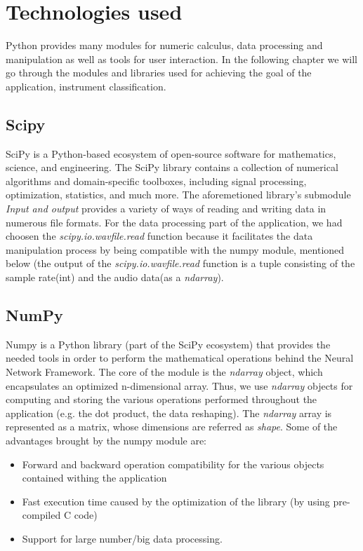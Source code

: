 \chapter{Technologies used}
Python provides many modules for numeric calculus, data processing and manipulation as  well as tools for user interaction.
In the following chapter we will go through the modules and libraries used for achieving the goal
of the application, instrument classification.

\section{Scipy}
SciPy is a Python-based ecosystem of open-source software for mathematics, science, and engineering. The SciPy library contains a collection of numerical algorithms and domain-specific toolboxes, including signal processing, optimization, statistics, and much more.\cite{scpd}
The aforemetioned library's submodule \textit{Input and output} provides a variety of ways of reading and writing data in numerous file formats. For the data processing part of the application, we had choosen the \textit{scipy.io.wavfile.read} function because it facilitates the data manipulation process by being compatible with the numpy module, mentioned below (the output of the \textit{scipy.io.wavfile.read} function is a tuple consisting of the sample rate(int) and the audio data(as a \textit{ndarray}).
\section{NumPy}
Numpy is a Python library (part of the SciPy ecosystem) that provides the needed tools in order to perform the mathematical operations behind
the Neural Network Framework. The core of the module is the \textit{ndarray} object, which encapsulates an
optimized n-dimensional array. Thus, we use \textit{ndarray} objects for computing and storing the various
operations performed throughout the application (e.g. the dot product, the data reshaping). The \textit{ndarray}
array is represented as a matrix, whose dimensions are referred as \textit{shape}.
Some of the advantages brought by the numpy module are:
\begin{itemize}
	\item Forward and backward operation compatibility for the various objects contained withing the application
	\item Fast execution time caused by the optimization of the library \cite{npd} (by using pre-compiled C code)
	\item Support for large number/big data processing.
\end{itemize}

